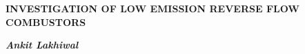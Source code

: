 \thispagestyle{plain}
\begin{center}
\vspace*{0.5cm}
{\Large \bf INVESTIGATION OF LOW EMISSION REVERSE FLOW COMBUSTORS\\}
\end{center}



\vspace{14cm}
\begin{flushright}
\begin{large}
{\bf {\em Ankit Lakhiwal}\noindent}
\end{large}
\end{flushright}
